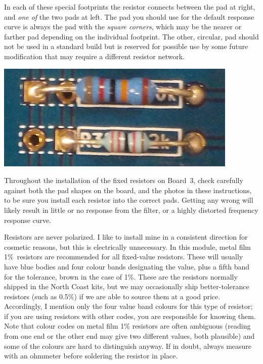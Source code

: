 In each of these special footprints the resistor connects between the pad at
right, and \emph{one of} the two pads at left.  The pad you should use for
the default response curve is always the pad with the \emph{square corners},
which may be the nearer or farther pad depending on the individual
footprint.  The other, circular, pad should not be used in a standard build
but is reserved for possible use by some future modification that may
require a different resistor network.

\noindent\includegraphics[width=\linewidth]{optres-filled.jpg}

Throughout the installation of the fixed resistors on Board~3, check
carefully against both the pad shapes on the board, and the photos in these
instructions, to be sure you install each resistor into the correct pads. 
Getting any wrong will likely result in little or no response from the
filter, or a highly distorted frequency response curve.

Resistors are never polarized.  I like to install mine in a consistent
direction for cosmetic reasons, but this is electrically unnecessary.  In
this module, metal film 1\%\ resistors are recommended for all fixed-value
resistors.  These will usually have blue bodies and four colour bands
designating the value, plus a fifth band for the tolerance, brown in the
case of 1\%.  These are the resistors normally shipped in the
North Coast kits, but we may occasionally ship better-tolerance resistors (such
as 0.5\%) if we are able to source them at a good price. 
Accordingly, I mention only the four value band colours for this type of
resistor; if you are using resistors with other codes, you are responsible
for knowing them.  Note that colour codes on metal film 1\% resistors are
often ambiguous (reading from one end or the other end may give two
different values, both plausible) and some of the colours are hard to
distinguish anyway.  If in doubt, always measure with an ohmmeter before
soldering the resistor in place.

